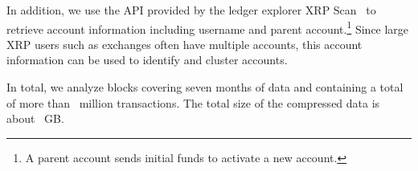 In addition, we use the API provided by the ledger explorer XRP Scan~\cite{xrpscan} to retrieve account information including username and parent account.\footnote{A parent account sends initial funds to activate a new account.} 
Since large XRP users such as exchanges often have multiple accounts, this account information can be used to identify and cluster accounts.

In total, we analyze \blockscount{\XRPStartBlock}{\XRPEndBlock} blocks covering seven months of data and containing a total of more than~ million transactions. The total size of the compressed data is about~ GB.










